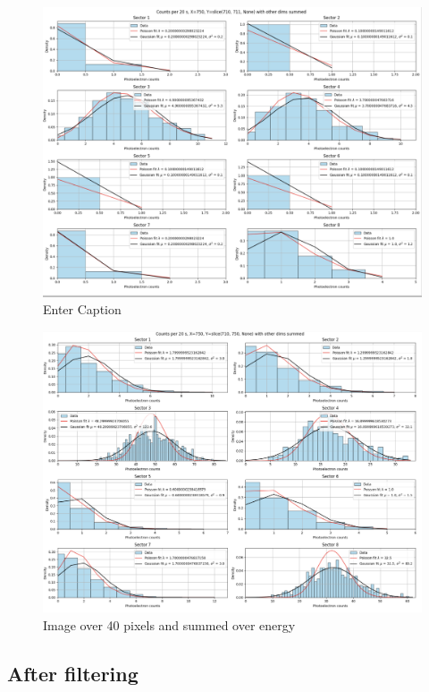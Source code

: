 \begin{figure}
    \centering
    \includegraphics[width=1\linewidth]{images/image.png}
    \caption{Enter Caption}
    \label{Image at one 2D pixel but summed over energy}
\end{figure}

\begin{figure}
    \centering
    \includegraphics[width=1\linewidth]{images/summed.png}
    \caption{Image over 40 pixels and summed over energy}
\end{figure}

\subsection{After filtering}

